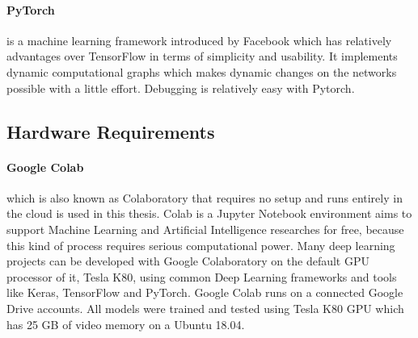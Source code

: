         \paragraph{PyTorch} is a machine learning framework introduced by Facebook which has relatively advantages over TensorFlow
            in terms of simplicity and usability. It implements dynamic computational graphs which makes dynamic changes
            on the networks possible with a little effort. Debugging is relatively easy with Pytorch.


    \subsection{Hardware Requirements}

        \paragraph{Google Colab} which is also known as Colaboratory that requires no setup and runs entirely in the cloud is used in this thesis.
            Colab is a Jupyter Notebook environment aims to support Machine Learning and Artificial Intelligence researches for free,
            because this kind of process requires serious computational power.
            Many deep learning projects can be developed with Google Colaboratory on the default GPU processor of it, Tesla K80, using common Deep Learning frameworks and tools like Keras,
            TensorFlow and PyTorch. Google Colab runs on a connected Google Drive accounts.
            All models were trained and tested using Tesla K80 GPU which has 25 GB of video memory on a Ubuntu 18.04.

